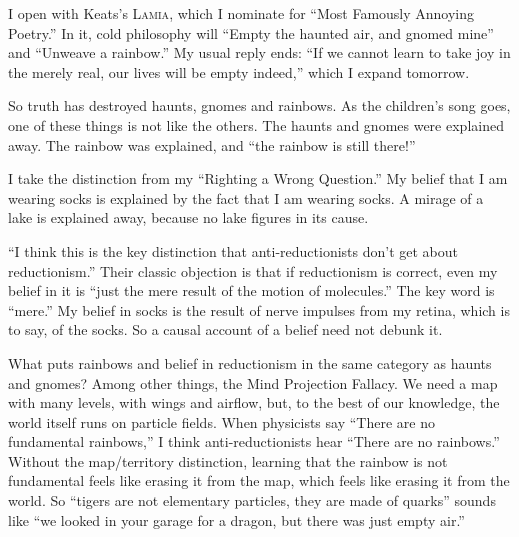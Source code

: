 
I open with Keats's \textsc{Lamia}, which I nominate for ``Most Famously Annoying Poetry.'' In it, cold philosophy will ``Empty the haunted air, and gnomed mine'' and ``Unweave a rainbow.'' My usual reply ends: ``If we cannot learn to take joy in the merely real, our lives will be empty indeed,'' which I expand tomorrow. 

So truth has destroyed haunts, gnomes and rainbows. As the children's song goes, one of these things is not like the others. The haunts and gnomes were explained away. The rainbow was explained, and ``the rainbow is still there!''

I take the distinction from my ``Righting a Wrong Question.'' My belief that I am wearing socks is explained by the fact that I am wearing socks. A mirage of a lake is explained away, because no lake figures in its cause.

``I think this is the key distinction that anti-reductionists don't get about reductionism.''  Their classic objection is that if reductionism is correct, even my belief in it is ``just the mere result of the motion of molecules.''  The key word is ``mere.'' My belief in socks is the result of nerve impulses from my retina, which is to say, of the socks. So a causal account of a belief need not debunk it. 

What puts rainbows and belief in reductionism in the same category as haunts and gnomes? Among other things, the Mind Projection Fallacy. We need a map with many levels, with wings and airflow, but, to the best of our knowledge, the world itself runs on particle fields. When physicists say ``There are no fundamental rainbows,'' I think anti-reductionists hear ``There are no rainbows.'' Without the map/territory distinction, learning that the rainbow is not fundamental feels like erasing it from the map, which feels like erasing it from the world. So ``tigers are not elementary particles, they are made of quarks'' sounds like ``we looked in your garage for a dragon, but there was just empty air.''

